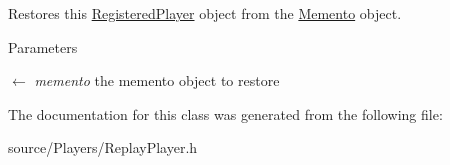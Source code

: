 Restores this \hyperlink{classRegisteredPlayer}{RegisteredPlayer} object from the \hyperlink{classMemento}{Memento} object. 
\begin{DoxyParams}{Parameters}
\item[\mbox{$\leftarrow$} {\em memento}]the memento object to restore \end{DoxyParams}


The documentation for this class was generated from the following file:\begin{DoxyCompactItemize}
\item 
source/Players/ReplayPlayer.h\end{DoxyCompactItemize}
